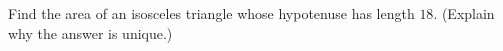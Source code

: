 Find the area of an isosceles triangle whose hypotenuse has length $18$. (Explain why the answer is unique.)
